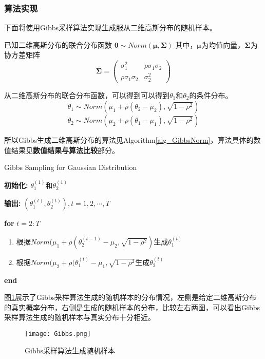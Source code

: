 \documentclass[11pt]{article}
\begin{document}
\subsubsection{算法实现}
下面将使用Gibbs采样算法实现生成服从二维高斯分布的随机样本。

已知二维高斯分布的联合分布函数
$\boldsymbol{\theta}\sim Norm (\boldsymbol{\mu},\boldsymbol{\Sigma})$
其中，$\boldsymbol{\mu}$为均值向量，$\boldsymbol{\Sigma}$为协方差矩阵
\[\boldsymbol{\Sigma} = \begin{pmatrix} \sigma_{1}^{2} & \rho\sigma_{1}\sigma_{2} \\
\rho\sigma_{1}\sigma_{2} & \sigma_{2}^{2}\end{pmatrix}\]

从二维高斯分布的联合分布函数，可以得到可以得到$\theta_{1}$和$\theta_{2}$的条件分布。
\[\theta_{1}\sim Norm(\mu_{1}+\rho(\theta_{2}-\mu_{2}),\sqrt{1-\rho^{2}})\]
\[\theta_{2}\sim Norm(\mu_{2}+\rho(\theta_{1}-\mu_{1}),\sqrt{1-\rho^{2}})\]

所以Gibbs生成二维高斯分布的算法见Algorithm\ref{alg_GibbsNorm}，算法具体的数值结果见\textbf{数值结果与算法比较}部分。

\begin{algorithm}[t] 
\caption{Gibbs Sampling for Gaussian Distribution} 
\textbf{初始化:} $\theta_{1}^{(1)}$和$\theta_{2}^{(1)}$

\textbf{输出:} $(\theta_{1}^{(t)},\theta_{2}^{(t)}),t=1,2,\cdots,T$

\textbf{for} $t=2:T$ 
\begin{enumerate} 
  \item 根据$Norm(\mu_{1}+\rho(\theta_{2}^{(t-1)}-\mu_{2},\sqrt{1-\rho^{2}})$生成$\theta_{1}^{(t)}$

  \item 根据$Norm(\mu_{2}+\rho(\theta_{1}^{(t)}-\mu_{1},\sqrt{1-\rho^{2}}$生成$\theta_{2}^{(t)}$

\end{enumerate} 
\textbf{end} 
\label{alg_GibbsNorm} 
\end{algorithm}

图\ref{TGibbs}展示了Gibbs采样算法生成的随机样本的分布情况，左侧是给定二维高斯分布的真实概率分布，右侧是生成的随机样本的分布，比较左右两图，可以看出Gibbs采样算法生成的随机样本与真实分布十分相近。

\begin{figure}
    \centering
    \texttt{[image: Gibbs.png]}
    \caption{\scriptsize{Gibbs采样算法生成随机样本}}
    \label{TGibbs}
\end{figure}
\end{document}
